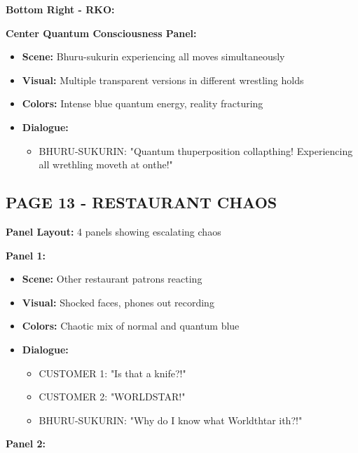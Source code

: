 \documentclass[12pt,a4paper]{article}
\begin{document}
\textbf{Bottom Right - RKO:}

\textbf{Center Quantum Consciousness Panel:}
\begin{itemize}
\item \textbf{Scene:} Bhuru-sukurin experiencing all moves simultaneously
\item \textbf{Visual:} Multiple transparent versions in different wrestling holds
\item \textbf{Colors:} Intense blue quantum energy, reality fracturing
\item \textbf{Dialogue:}
\begin{itemize}
\item BHURU-SUKURIN: "Quantum thuperposition collapthing! Experiencing all wrethling moveth at onthe!"
\end{itemize}
\end{itemize}

\subsection{PAGE 13 - RESTAURANT CHAOS}

\textbf{Panel Layout:} 4 panels showing escalating chaos

\textbf{Panel 1:}
\begin{itemize}
\item \textbf{Scene:} Other restaurant patrons reacting
\item \textbf{Visual:} Shocked faces, phones out recording
\item \textbf{Colors:} Chaotic mix of normal and quantum blue
\item \textbf{Dialogue:}
\begin{itemize}
\item CUSTOMER 1: "Is that a knife?!"
\item CUSTOMER 2: "WORLDSTAR!"
\item BHURU-SUKURIN: "Why do I know what Worldthtar ith?!"
\end{itemize}
\end{itemize}

\textbf{Panel 2:}
\end{document}

